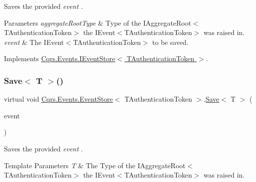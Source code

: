 Saves the provided {\itshape event} . 


\begin{DoxyParams}{Parameters}
{\em aggregate\+Root\+Type} & Type of the I\+Aggregate\+Root$<$\+T\+Authentication\+Token$>$ the I\+Event$<$\+T\+Authentication\+Token$>$ was raised in.\\
\hline
{\em event} & The I\+Event$<$\+T\+Authentication\+Token$>$ to be saved.\\
\hline
\end{DoxyParams}


Implements \hyperlink{interfaceCqrs_1_1Events_1_1IEventStore_a81fb586703e7c6dea6b23d9a95f3887a_a81fb586703e7c6dea6b23d9a95f3887a}{Cqrs.\+Events.\+I\+Event\+Store$<$ T\+Authentication\+Token $>$}.

\mbox{\label{classCqrs_1_1Events_1_1EventStore_a958854f49c3eb4fcf1922ba7737a8dfe_a958854f49c3eb4fcf1922ba7737a8dfe}} 
\subsubsection{\texorpdfstring{Save$<$ T $>$()}{Save< T >()}}
{\footnotesize\ttfamily virtual void \hyperlink{classCqrs_1_1Events_1_1EventStore}{Cqrs.\+Events.\+Event\+Store}$<$ T\+Authentication\+Token $>$.\hyperlink{classCqrs_1_1Events_1_1EventStore_a3ba5ba04a36382b6d36a6ad8867dc766_a3ba5ba04a36382b6d36a6ad8867dc766}{Save}$<$ T $>$ (\begin{DoxyParamCaption}\item[{\hyperlink{interfaceCqrs_1_1Events_1_1IEvent}{I\+Event}$<$ T\+Authentication\+Token $>$ @}]{event }\end{DoxyParamCaption})\hspace{0.3cm}{\ttfamily [virtual]}}



Saves the provided {\itshape event} . 


\begin{DoxyTemplParams}{Template Parameters}
{\em T} & The Type of the I\+Aggregate\+Root$<$\+T\+Authentication\+Token$>$ the I\+Event$<$\+T\+Authentication\+Token$>$ was raised in.\\
\hline
\end{DoxyTemplParams}

